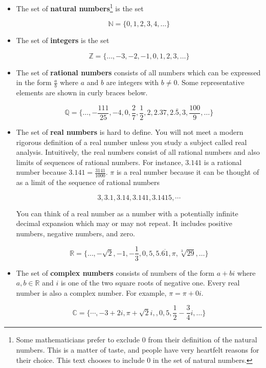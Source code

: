 \begin{itemize}
		\item The set of \textbf{natural numbers}\footnote{Some mathematicians prefer to exclude $0$ from their definition of the natural numbers.  This is a matter of taste, and people have very heartfelt reasons for their choice.  This text chooses to include $0$ in the set of natural numbers.}  is the set
		
		\[
		\mathbb{N} = \{0,1,2,3,4, \dots \}
		\]
		
		\item The set of \textbf{integers} is the set
		
		\[
		\mathbb{Z} = \{\dots, -3,-2,-1,0,1,2,3,\dots\}
		\]
		
		\item The set of \textbf{rational numbers} consists of all numbers which can be expressed in the form $\frac{a}{b}$ where $a$ and $b$ are integers with $b \neq 0$.  Some representative elements are shown in curly braces below.
		
		\[
		\mathbb{Q} = \{ \dots,  -\frac{111}{25},-4,0,\frac{2}{7}, \frac{1}{2}, 2, 2.37, 2.\bar{5}, 3, \frac{100}{9}, \dots\}
		\] 
		
		\item The set of \textbf{real numbers} is hard to define.  You will not meet a modern rigorous definition of a real number unless you study a subject called real analysis.  Intuitively, the real numbers consist of all rational numbers and also limits of sequences of rational numbers.  For instance, $3.141$ is a rational number because $3.141 = \frac{3141}{1000}$.  $\pi$ is a real number because it can be thought of as a limit of the sequence of rational numbers 
		
		\[3, 3.1, 3.14, 3.141, 3.1415, \cdots\]
		
		You can think of a real number as a number with a potentially infinite decimal expansion which may or may not repeat.  It includes positive numbers, negative numbers, and zero.
		
		\[
		\mathbb{R} = \{ \dots, -\sqrt{2}, -1, -\frac{1}{3}, 0, 5, 5.\overline{61}, \pi, \sqrt[3]{29}, \dots \}
		\]
		
		\item The set of \textbf{complex numbers} consists of numbers of the form $a+bi$ where $a,b \in \mathbb{R}$ and $i$ is one of the two square roots of negative one.  Every real number is also a complex number.  For example, $\pi = \pi + 0i$.
		
		\[
		\mathbb{C} = \{\cdots, -3+2i, \pi+\sqrt{2}i, ,0, 5, \frac{1}{2} - \frac{3}{4} i, \dots \}
		\]
	\end{itemize}

